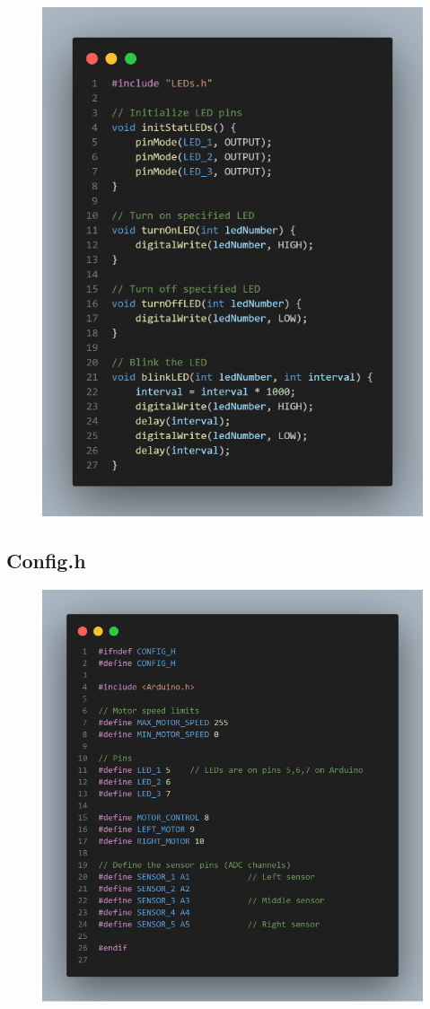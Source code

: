 \begin{figure}[H]
    \centering
    \includegraphics[width=0.8\linewidth]{REPORT/ledscode.png}
\end{figure}

\subsection{Config.h}

\begin{figure}[H]
    \centering
    \includegraphics[width=0.8\linewidth]{REPORT/configcode.png}
\end{figure}

